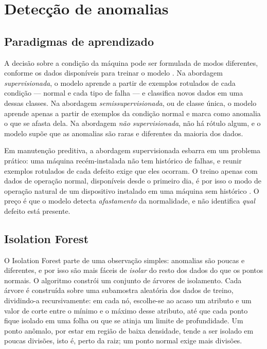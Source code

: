 \section{Detecção de anomalias}
\label{sec:fund-anomalias}

\subsection{Paradigmas de aprendizado}

A decisão sobre a condição da máquina pode ser formulada de modos diferentes, conforme os
dados disponíveis para treinar o modelo \cite{chandola2009}. Na abordagem
\emph{supervisionada}, o modelo aprende a partir de exemplos rotulados de cada condição ---
normal e cada tipo de falha --- e classifica novos dados em uma dessas classes. Na
abordagem \emph{semissupervisionada}, ou de classe única, o modelo aprende apenas a partir
de exemplos da condição normal e marca como anomalia o que se afasta dela. Na abordagem
\emph{não supervisionada}, não há rótulo algum, e o modelo supõe que as anomalias são raras
e diferentes da maioria dos dados.

Em manutenção preditiva, a abordagem supervisionada esbarra em um problema prático: uma
máquina recém-instalada não tem histórico de falhas, e reunir exemplos rotulados de cada
defeito exige que eles ocorram. O treino apenas com dados de operação normal, disponíveis
desde o primeiro dia, é por isso o modo de operação natural de um dispositivo instalado
em uma máquina sem histórico \cite{chandola2009}. O preço é que o modelo detecta
\emph{afastamento} da normalidade, e não identifica \emph{qual} defeito está presente.

\subsection{Isolation Forest}
\label{sec:fund-iforest}

O Isolation Forest \cite{liu2008} parte de uma observação simples: anomalias são poucas e
diferentes, e por isso são mais fáceis de \emph{isolar} do resto dos dados do que os pontos
normais. O algoritmo constrói um conjunto de árvores de isolamento. Cada árvore é
construída sobre uma subamostra aleatória dos dados de treino, dividindo-a recursivamente:
em cada nó, escolhe-se ao acaso um atributo e um valor de corte entre o mínimo e o máximo
desse atributo, até que cada ponto fique isolado em uma folha ou que se atinja um limite de
profundidade. Um ponto anômalo, por estar em região de baixa densidade, tende a ser isolado
em poucas divisões, isto é, perto da raiz; um ponto normal exige mais divisões.

